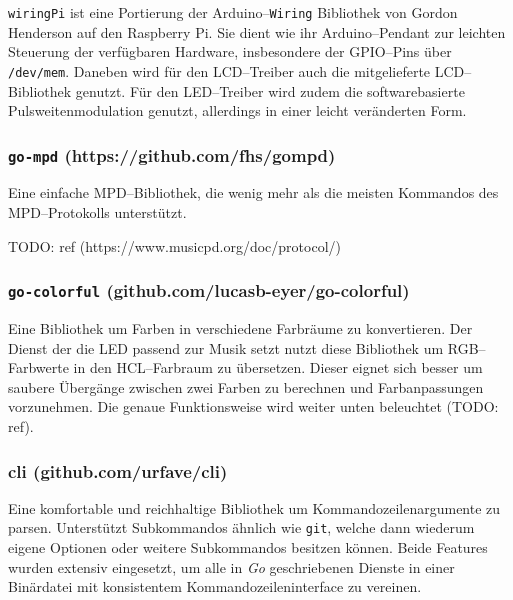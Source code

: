 \documentclass[11pt,ngerman,toc=listof,index=totoc]{scrreprt}
\begin{document}
\texttt{wiringPi} ist eine Portierung der Arduino--\texttt{Wiring}
Bibliothek von Gordon Henderson auf den Raspberry Pi. Sie dient wie ihr
Arduino--Pendant zur leichten Steuerung der verfügbaren Hardware,
insbesondere der GPIO--Pins über \texttt{/dev/mem}. Daneben wird für den
LCD--Treiber auch die mitgelieferte LCD--Bibliothek genutzt. Für den
LED--Treiber wird zudem die softwarebasierte Pulsweitenmodulation
genutzt, allerdings in einer leicht veränderten Form.

\subsubsection{\texorpdfstring{\texttt{go-mpd}
(https://github.com/fhs/gompd)}{go-mpd (https://github.com/fhs/gompd)}}\label{go-mpd-httpsgithub.comfhsgompd}

Eine einfache MPD--Bibliothek, die wenig mehr als die meisten Kommandos
des MPD--Protokolls unterstützt.

TODO: ref (https://www.musicpd.org/doc/protocol/)

\subsubsection{\texorpdfstring{\texttt{go-colorful}
(github.com/lucasb-eyer/go-colorful)}{go-colorful (github.com/lucasb-eyer/go-colorful)}}\label{go-colorful-github.comlucasb-eyergo-colorful}

Eine Bibliothek um Farben in verschiedene Farbräume zu konvertieren. Der
Dienst der die LED passend zur Musik setzt nutzt diese Bibliothek um
RGB--Farbwerte in den HCL--Farbraum zu übersetzen. Dieser eignet sich
besser um saubere Übergänge zwischen zwei Farben zu berechnen und
Farbanpassungen vorzunehmen. Die genaue Funktionsweise wird weiter unten
beleuchtet (TODO: ref).

\subsubsection{cli
(github.com/urfave/cli)}\label{cli-github.comurfavecli}

Eine komfortable und reichhaltige Bibliothek um Kommandozeilenargumente
zu parsen. Unterstützt Subkommandos ähnlich wie \texttt{git}, welche
dann wiederum eigene Optionen oder weitere Subkommandos besitzen können.
Beide Features wurden extensiv eingesetzt, um alle in \emph{Go}
geschriebenen Dienste in einer Binärdatei mit konsistentem
Kommandozeileninterface zu vereinen.
\end{document}
